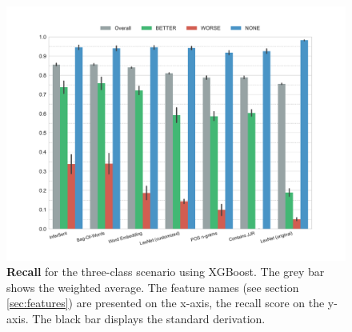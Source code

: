   \begin{figure}[htbp]
              \caption{\textbf{Recall} for the three-class scenario using XGBoost. The grey bar shows the weighted average. The feature names (see section \ref{sec:features}) are presented on the x-axis, the recall score on the y-axis. The black bar displays the standard derivation.} 
       \label{fig:3_recall}
 \centering
	\includegraphics[width=1\textwidth]{images/experiments/recall-False}
\end{figure}

\FloatBarrier

